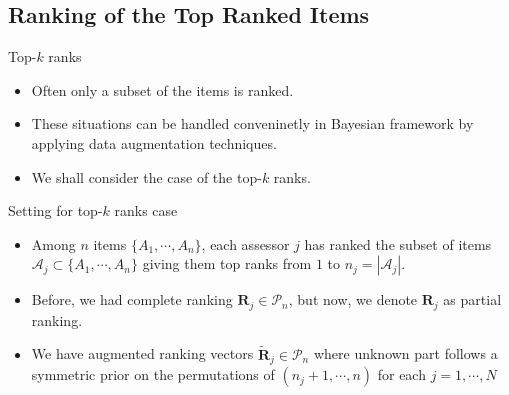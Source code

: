 \documentclass[11pt]{beamer}
\begin{document}
\subsection{Ranking of the Top Ranked Items}
\begin{frame}{Top-$k$ ranks}
\begin{itemize}
    \item Often only a subset of the items is ranked.
    \item These situations can be handled conveninetly in Bayesian framework by applying data augmentation techniques.
    \item We shall consider the case of the top-$k$ ranks.
\end{itemize}
\end{frame}

\begin{frame}{Setting for top-$k$ ranks case}
\begin{itemize}
    \item Among $n$ items $\{A_1, \cdots, A_n\}$, each assessor $j$ has ranked the subset of items $\mathcal{A}_j\subset\{A_1, \cdots, A_n\}$ giving them top ranks from $1$ to $n_j=|\mathcal{A}_j|$. 
    \item Before, we had complete ranking $\mathbf{R}_j\in \mathcal{P}_n$, but now, we denote $\mathbf{R}_j$ as partial ranking.
    \item We have augmented ranking vectors $\tilde{\mathbf{R}}_j\in \mathcal{P}_n$ where unknown part follows a symmetric prior on the permutations of $(n_j+1, \cdots, n)$ for each $j=1, \cdots, N$
\end{itemize}
\end{frame}
\end{document}
